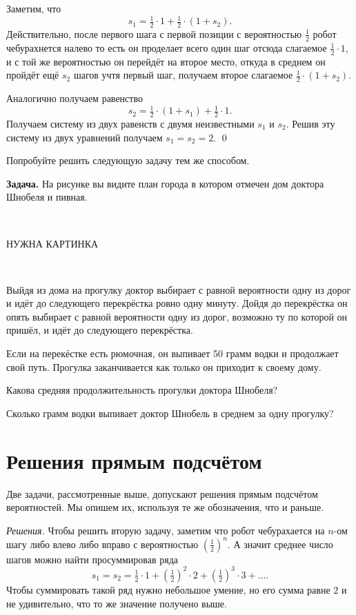 \documentclass{article}
\begin{document}
Заметим, что 
\[s_1=\tfrac12\cdot1+\tfrac12\cdot (1+s_2).\]
Действительно, после первого шага с первой позиции
с вероятностью $\tfrac12$ робот чебурахнется налево то есть он проделает всего один шаг
отсюда слагаемое $\tfrac12\cdot1$,
и с той же вероятностью он перейдёт на второе место,
откуда в среднем он пройдёт ещё $s_2$ шагов
учтя первый шаг, получаем второе слагаемое $\tfrac12\cdot (1+s_2)$.

Аналогично получаем равенство
\[s_2=\tfrac12\cdot (1+s_1)+\tfrac12\cdot 1.\]
Получаем систему из двух равенств с двумя неизвестными $s_1$ и $s_2$.
Решив эту систему из двух уравнений получаем 
$s_1=s_2=2$.
\qed
\medskip

Попробуйте решить следующую задачу тем же способом.

\medskip
\noindent\textbf{Задача.}
На рисунке вы видите план города в котором отмечен дом доктора
Шнобеля и пивная.

\ 

НУЖНА КАРТИНКА

\ 

Выйдя из дома на прогулку доктор выбирает с равной вероятности 
одну из дорог и идёт до следующего перекрёстка ровно одну минуту.
Дойдя до перекрёстка он опять выбирает с равной вероятности 
одну из дорог, возможно ту по которой он пришёл, 
и идёт до следующего перекрёстка.

Если на перекёстке есть рюмочная, 
он выпивает 50 грамм водки и продолжает свой путь.
Прогулка заканчивается как только он приходит к своему дому.

Какова средняя продолжительность прогулки доктора Шнобеля?

Сколько грамм водки выпивает доктор Шнобель в среднем за одну прогулку? 

\section{Решения прямым подсчётом}

Две задачи, рассмотренные выше, допускают решения прямым подсчётом вероятностей. 
Мы опишем их, используя те же обозначения, что и раньше.

\medskip
\noindent\textit{Решения.}
Чтобы решить вторую задачу, 
заметим что робот чебурахается на $n$-ом шагу либо влево либо вправо с вероятностью $(\tfrac12)^n$.
А значит среднее число шагов можно найти просуммировав ряда
\[s_1=s_2=\tfrac12\cdot1+(\tfrac12)^2\cdot 2+(\tfrac12)^3\cdot 3+\dots.\]
Чтобы суммировать такой ряд нужно небольшое умение, 
но его сумма равне $2$ и не удивительно, что то же значение получено выше.
\end{document}
